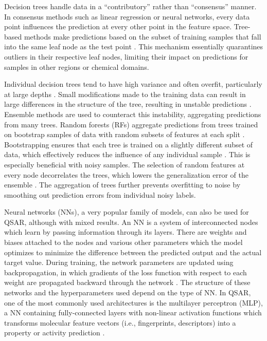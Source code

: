 Decision trees handle data in a ``contributory'' rather than ``consensus'' manner. In consensus methods such as linear regression or neural networks, every data point influences the prediction at every other point in the feature space. Tree-based methods make predictions based on the subset of training samples that fall into the same leaf node as the test point \citep{Breiman1984}. This mechanism essentially quarantines outliers in their respective leaf nodes, limiting their impact on predictions for samples in other regions or chemical domains. 

Individual decision trees tend to have high variance and often overfit, particularly at large depths \citep{Breiman1984}. Small modifications made to the training data can result in large differences in the structure of the tree, resulting in unstable predictions \citep{Breiman1996}. Ensemble methods are used to counteract this instability, aggregating predictions from many trees. Random forests (RFs) aggregate predictions from trees trained on bootstrap samples of data with random subsets of features at each split \citep{Breiman2001}. Bootstrapping ensures that each tree is trained on a slightly different subset of data, which effectively reduces the influence of any individual sample \citep{Breiman2001}. This is especially beneficial with noisy samples. The selection of random features at every node decorrelates the trees, which lowers the generalization error of the ensemble \citep{Breiman2001}. The aggregation of trees further prevents overfitting to noise by smoothing out prediction errors from individual noisy labels. 

Neural networks (NNs), a very popular family of models, can also be used for QSAR, although with mixed results. An NN is a system of interconnected nodes which learn by passing information through its layers. There are weights and biases attached to the nodes and various other parameters which the model optimizes to minimize the difference between the predicted output and the actual target value. During training, the network parameters are updated using backpropagation, in which gradients of the loss function with respect to each weight are propagated backward through the network \citep{Rumelhart1986}. The structure of these networks and the hyperparameters used depend on the type of NN. In QSAR, one of the most commonly used architectures is the multilayer perceptron (MLP), a NN containing fully-connected layers with non-linear activation functions which transforms molecular feature vectors (i.e., fingerprints, descriptors) into a property or activity prediction \citep{Ma2015}.

